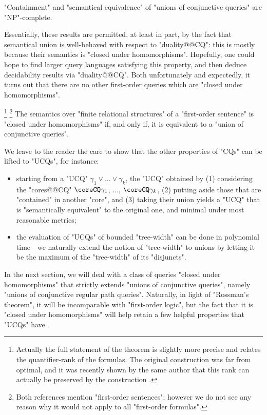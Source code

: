 \begin{corollary}
	"Containment" and "semantical equivalence" of "unions of conjunctive queries"
	are "NP"-complete.
\end{corollary}

Essentially, these results are permitted, at least in part, by the fact that semantical union
is well-behaved with respect to "duality@@CQ": this is mostly because their semantics 
is "closed under homomorphisms". Hopefully, one could hope to find larger
query languages satisfying this property, and then deduce decidability results via "duality@@CQ".
Both unfortunately and expectedly, it turns out that there
are no other first-order queries which are "closed under homomorphisms".\AP
\begin{proposition}
	\!\footnote{Actually the full statement of the theorem is
	slightly more precise and relates the quantifier-rank of the formulas.
	The original construction was far from optimal, and it was
	recently shown by the same author
	that this rank can actually be preserved by the construction
	\cite[Theorem~1.4]{Rossman2025Equirank}.}%
	\footnote{Both references mention "first-order sentences"; however we do not see
	any reason why it would not apply to all "first-order formulas".}
	The semantics over "finite relational structures"
	of a "first-order sentence" is "closed under homomorphisms"
	if, and only if, it is equivalent to a "union of conjunctive queries".
\end{proposition}

We leave to the reader the care to show that the other properties of "CQs"
can be lifted to "UCQs", for instance:
\begin{itemize}
	\item starting from a "UCQ" $\gamma_1 \lor \dotsc \lor \gamma_k$,
		the "UCQ" obtained by (1) considering the "cores@@CQ"
		$\coreCQ\gamma_1$, $\dotsc$, $\coreCQ\gamma_k$,
		(2) putting aside those that are "contained" in another "core",
		and (3) taking their union
		yields a "UCQ" that is "semantically equivalent" to the
		original one, and minimal under most reasonable metrics;
	\item the evaluation of "UCQs" of bounded "tree-width" can be done in
		polynomial time---we naturally
		extend the notion of "tree-width" to unions by letting it
		be the maximum of the "tree-width" of its "disjuncts".
\end{itemize}

In the next section, we will deal with a class of queries "closed
under homomorphisms" that strictly extends "unions of conjunctive queries", namely
"unions of conjunctive regular path queries".
Naturally, in light of "Rossman's theorem", it will be
incomparable with "first-order logic", but the fact that it is
"closed under homomorphisms" will help retain a few helpful properties
that "UCQs" have.